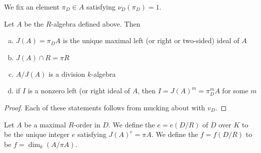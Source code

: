 We fix an element $\pi_D\in A$ satisfying $\nu_D(\pi_D) = 1$.
\begin{prop}
Let $A$ be the $R$-algebra defined above.  Then
\begin{enumerate}[(a)]
\item $J(A) = \pi_DA$ is the unique maximal left (or right or two-sided) ideal of $A$
\item $J(A)\cap R = \pi R$
\item $A/J(A)$ is a division $k$-algebra
\item if $I$ is a nonzero left (or right ideal of $A$, then $I = J(A)^m = \pi_D^mA$ for some $m$
\end{enumerate}
\end{prop}
\begin{proof}
Each of these statements follows from mucking about with $v_D$.
\end{proof}

\begin{defn}
Let $A$ be a maximal $R$-order in $D$.  We define the  $e = e(D/R)$ of $D$ over $K$ to be the unique integer $e$ satisfying $J(A)^e = \pi A$.  We define the  $f = f(D/R)$ to be $f = \dim_k(A/\pi A)$.
\end{defn}

